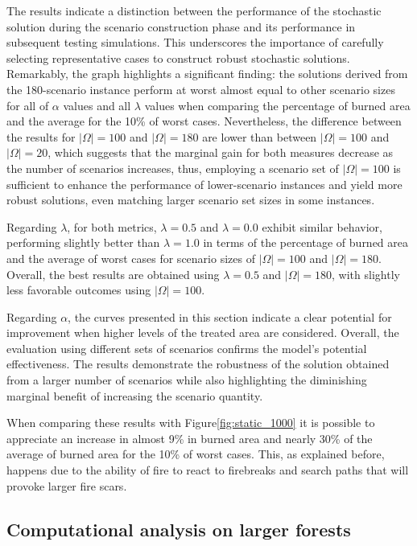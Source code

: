 \documentclass[a4paper,fleqn]{cas-sc}
\begin{document}
The results indicate a distinction between the performance of the stochastic solution during the scenario construction phase and its performance in subsequent testing simulations. This underscores the importance of carefully selecting representative cases to construct robust stochastic solutions. Remarkably, the graph highlights a significant finding: the solutions derived from the 180-scenario instance perform at worst almost equal to other scenario sizes for all of $\alpha$ values and all $\lambda $ values when comparing the percentage of burned area and the average for the 10\% of worst cases. Nevertheless, the difference between the results for $|\Omega| = 100$ and $|\Omega| = 180$ are lower than between  $|\Omega| = 100$ and $|\Omega| = 20$, which suggests that the marginal gain for both measures decrease as the number of scenarios increases, thus, employing a scenario set of $|\Omega| = 100$ is sufficient to enhance the performance of lower-scenario instances and yield more robust solutions, even matching larger scenario set sizes in some instances.

Regarding $\lambda$, for both metrics, $\lambda = 0.5$ and $\lambda = 0.0$ exhibit similar behavior, performing slightly better than $\lambda = 1.0$ in terms of the percentage of burned area and the average of worst cases for scenario sizes of $|\Omega| = 100$ and $|\Omega| = 180$. Overall, the best results are obtained using $\lambda = 0.5$ and $|\Omega| = 180$, with slightly less favorable outcomes using $|\Omega| = 100$.

Regarding $\alpha$, the curves presented in this section indicate a clear potential for improvement when higher levels of the treated area are considered. Overall, the evaluation using different sets of scenarios confirms the model's potential effectiveness. The results demonstrate the robustness of the solution obtained from a larger number of scenarios while also highlighting the diminishing marginal benefit of increasing the scenario quantity.

When comparing these results with Figure\:\ref{fig:static_1000} it is possible to appreciate an increase in almost 9\% in burned area and nearly 30\% of the average of burned area for the 10\% of worst cases. This, as explained before, happens due to the ability of fire to react to firebreaks and search paths that will provoke larger fire scars.

    
\subsection{Computational analysis on larger forests}\label{s:results}
\end{document}

